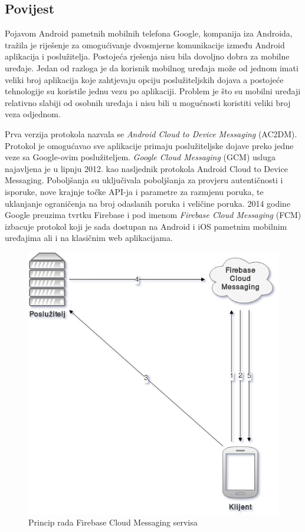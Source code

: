 \documentclass[times, utf8, zavrsni]{fer}
\begin{document}
\subsection{Povijest}
Pojavom Android pametnih mobilnih telefona Google, kompanija iza Androida, tražila je riješenje za omogućivanje dvosmjerne komunikacije između Android aplikacija i poslužitelja. Postojeća rješenja nisu bila dovoljno dobra za mobilne uređaje. Jedan od razloga je da korisnik mobilnog uređaja može od jednom imati veliki broj aplikacija koje zahtjevaju opciju poslužiteljskih dojava a postojeće tehnologije su koristile jednu vezu po aplikaciji. Problem je što su mobilni uređaji relativno slabiji od osobnih uređaja i nisu bili u mogućnosti koristiti veliki broj veza odjednom.

Prva verzija protokola nazvala se {\em Android Cloud to Device Messaging} (AC2DM). Protokol je omogućavao sve aplikacije primaju poslužiteljske dojave preko jedne veze sa Google-ovim poslužiteljem. {\em Google Cloud Messaging} (GCM) usluga najavljena je u lipnju 2012. kao nasljednik protokola Android Cloud to Device Messaging. Poboljšanja su uključivala poboljšanja za provjeru autentičnosti i isporuke, nove krajnje točke API-ja i parametre za razmjenu poruka, te uklanjanje ograničenja na broj odaslanih poruka i veličine poruka. 2014 godine Google preuzima tvrtku Firebase i pod imenom {\em Firebase Cloud Messaging} (FCM) izbacuje protokol koji je sada dostupan na Android i iOS pametnim mobilnim uređajima ali i na klasičnim web aplikacijama.

\begin{figure}[htb]
\centering
\includegraphics[width=14cm]{img/fcm.png}
\caption{Princip rada Firebase Cloud Messaging servisa}
\label{fig:fcm-image}
\end{figure}
\end{document}
